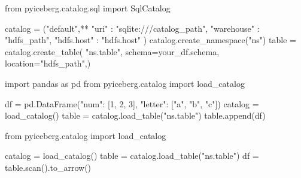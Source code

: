 \begin{minipage}{\textwidth}
    \begin{python}[caption={[Instanciate Iceberg catalog with SQLite] Instanciating an Iceberg catalog using SQLite}, label={lst:ch4_instanciate_catalog}, basicstyle=\small]
    from pyiceberg.catalog.sql import SqlCatalog

    catalog = ("default",**{
            "uri" : "sqlite:///catalog_path",
            "warehouse" : "hdfs_path", 
            "hdfs.host" : "hdfs.host" }) 
    catalog.create_namespace("ns")
    table = catalog.create_table(
                    "ns.table", 
                    schema=your_df.schema,
                    location="hdfs_path",)
    \end{python}
\end{minipage}
\medskip


\begin{minipage}{\textwidth}
    \begin{python}[caption={[Writing with PyIceberg] Writing a DataFrame with PyIceberg on an Iceberg Table stored on \gls{HopsFS} (or \gls{HDFS}).}, label={lst:ch4_iceberg_write}, basicstyle=\small]
    import pandas as pd
    from pyiceberg.catalog import load_catalog

    df = pd.DataFrame({"num": [1, 2, 3], 
                       "letter": ["a", "b", "c"]})
    catalog = load_catalog()
    table   = catalog.load_table("ns.table")
    table.append(df)
    \end{python}
\end{minipage}
\medskip


\begin{minipage}{\textwidth}
    \begin{python}[caption={[Reading with PyIceberg] Reading a table with PyIceberg from an Iceberg Table stored on \gls{HopsFS} (or \gls{HDFS}).}, label={lst:ch4_iceberg_read}, basicstyle=\small]
    from pyiceberg.catalog import load_catalog

    catalog = load_catalog()
    table   = catalog.load_table("ns.table")
    df      = table.scan().to_arrow()
    \end{python}
\end{minipage}
\medskip